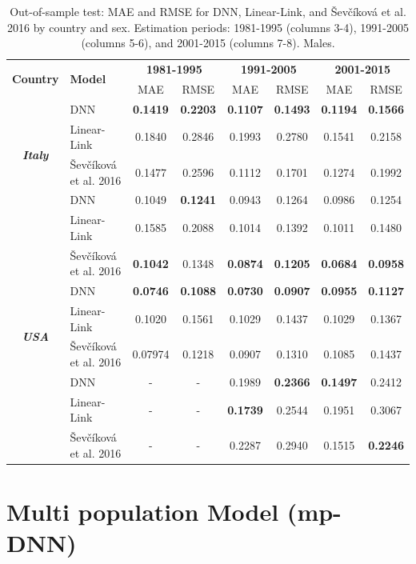 \documentclass[a4,11pt]{article}
\begin{document}
\begin{table}[H]
		\centering
		\caption{Out-of-sample test: MAE and RMSE for DNN, Linear-Link, and \v{S}ev\v{c}\'{i}kov\'{a} et al. 2016 by country and sex. Estimation periods: 1981-1995 (columns 3-4), 1991-2005 (columns 5-6), and 2001-2015 (columns 7-8). Males.}
		\label{tab:2}
			\footnotesize	
		\begin{tabular}{cl|cc|cc|cc}
			\hline 		
			\multirow{2}{*}{\textbf{Country}} & \multirow{2}{*}{\textbf{Model}} & \multicolumn{2}{c|}{\textbf{1981-1995}} & \multicolumn{2}{c}{\textbf{1991-2005}} & \multicolumn{2}{c}{\textbf{2001-2015}}\tabularnewline
			\cline{3-8} 
			& & MAE & RMSE & MAE & RMSE & MAE & RMSE\tabularnewline
			\hline 
			\multirow{4}{*}{\textbf{\textit{Italy}}} & \multirow{1}{*}{DNN} &\textbf{0.1419}& \textbf{0.2203}&\textbf{0.1107}& \textbf{0.1493}&\textbf{0.1194}& \textbf{0.1566} \tabularnewline
			& \multirow{1}{*}{Linear-Link} &0.1840 &0.2846& 0.1993& 0.2780&0.1541& 0.2158 \tabularnewline
      & \multirow{1}{*}{\v{S}ev\v{c}\'{i}kov\'{a} et al. 2016}& 0.1477 &0.2596 &0.1112 &0.1701 &0.1274 &0.1992 \tabularnewline
      \hline 
			\multirow{4}{*}{\textbf{\textit{Japan}}} & \multirow{1}{*}{DNN} &0.1049&\textbf{ 0.1241}& 0.0943&0.1264& 0.0986& 0.1254 \tabularnewline
			& \multirow{1}{*}{Linear-Link} &0.1585 &0.2088& 0.1014& 0.1392&0.1011& 0.1480 \tabularnewline
      & \multirow{1}{*}{\v{S}ev\v{c}\'{i}kov\'{a} et al. 2016}&\textbf{0.1042} &0.1348& \textbf{0.0874}& \textbf{0.1205}&\textbf{0.0684} & \textbf{0.0958} \tabularnewline
      \hline
			 \multirow{4}{*}{\textbf{\textit{USA}}} &\multirow{1}{*}{DNN} &\textbf{0.0746} &\textbf{0.1088}&\textbf{ 0.0730}&\textbf{0.0907}&\textbf{0.0955}& \textbf{0.1127}\tabularnewline
			& \multirow{1}{*}{Linear-Link} &0.1020 &0.1561& 0.1029& 0.1437&0.1029& 0.1367 \tabularnewline
 	 		&\multirow{1}{*}{\v{S}ev\v{c}\'{i}kov\'{a} et al. 2016}&0.07974 &0.1218& 0.0907& 0.1310&0.1085& 0.1437 \tabularnewline
 	 		\hline 
	 \multirow{4}{*}{\textbf{\textit{Russia (2014)}}} &\multirow{1}{*}{DNN} &-&-&0.1989&\textbf{0.2366}&\textbf{0.1497}& 0.2412\tabularnewline
			& \multirow{1}{*}{Linear-Link} &-&-& \textbf{0.1739}& 0.2544&0.1951& 0.3067 \tabularnewline
 	 		&\multirow{1}{*}{\v{S}ev\v{c}\'{i}kov\'{a} et al. 2016}&-&-& 0.2287&0.2940&0.1515& \textbf{0.2246} \tabularnewline
 	 		\hline 

		\end{tabular}
	\end{table}

\section{Multi population Model (mp-DNN)}
\end{document}
